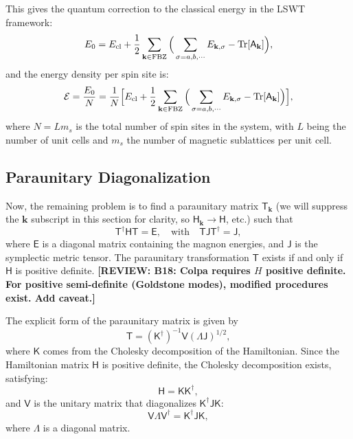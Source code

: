 \documentclass[aps, prx, nofootinbib, superscriptaddress]{revtex4-2}
\newcommand{\REVIEW}[1]{{\color{reviewcolor}\bfseries [REVIEW: #1]}}
\newcommand{\kvec}{\mathbf{k}}
\newcommand{\Tr}{\mathrm{Tr}}
\begin{document}
This gives the quantum correction to the classical energy in the LSWT framework:
\begin{equation}\label{eq: def. of zero point energy}
    E_{0} = E_{\rm cl} + \frac{1}{2} \sum_{\mathbf{k} \in \mathrm{FBZ}} \Big( \sum_{\sigma=a,b,\cdots} E_{\mathbf{k}, \sigma} -  \Tr[\mathsf{A}_{\mathbf{k}}] \Big),
\end{equation}
and the energy density per spin site is:
\begin{equation}
    \mathcal{E} 
    = \frac{E_{0}}{N} 
    = \frac{1}{N} \Big[ E_{\rm cl} + \frac{1}{2} \sum_{\mathbf{k} \in \mathrm{FBZ}} \Big( \sum_{\sigma=a,b,\cdots} E_{\mathbf{k}, \sigma} -  \Tr[\mathsf{A}_{\mathbf{k}}] \Big) \Big],
\end{equation}
where $N=Lm_{s}$ is the total number of spin sites in the system, with $L$ being the number of unit cells and $m_s$ the number of magnetic sublattices per unit cell.



\subsection{Paraunitary Diagonalization}
Now, the remaining problem is to find a paraunitary matrix $\mathsf{T}_{\kvec}$ (we will suppress the $\kvec$ subscript in this section for clarity, so $\mathsf{H}_{\kvec} \rightarrow \mathsf{H}$, etc.) such that
\begin{equation}
    \mathsf{T}^{\dagger}\mathsf{HT} = \mathsf{E}, \quad \text{with}
    \quad \mathsf{TJT}^{\dagger} = \mathsf{J},
\end{equation}
where $\mathsf{E}$ is a diagonal matrix containing the magnon energies, and $\mathsf{J}$ is the symplectic metric tensor. The paraunitary transformation $\mathsf{T}$ exists if and only if $\mathsf{H}$ is positive definite.
\REVIEW{B18: Colpa requires $H$ positive definite. For positive semi-definite (Goldstone modes), modified procedures exist. Add caveat.}

The explicit form of the paraunitary matrix is given by 
\begin{equation}
    \mathsf{T} = (\mathsf{K}^{\dagger})^{-1} \mathsf{V} \mathsf{(\Lambda J)}^{1/2},
\end{equation}
where $\mathsf{K}$ comes from the Cholesky decomposition of the Hamiltonian. Since the Hamiltonian matrix $\mathsf{H}$ is positive definite, the Cholesky decomposition exists, satisfying:
\begin{equation}
    \mathsf{H} = \mathsf{KK}^{\dagger},
\end{equation}
and $\mathsf{V}$ is the unitary matrix that diagonalizes $\mathsf{K}^{\dagger} \mathsf{JK}$:
\begin{equation}
    \mathsf{V \Lambda V}^{\dagger} = \mathsf{K}^{\dagger} \mathsf{JK},
\end{equation}
where $\mathsf{\Lambda}$ is a diagonal matrix.
\end{document}
